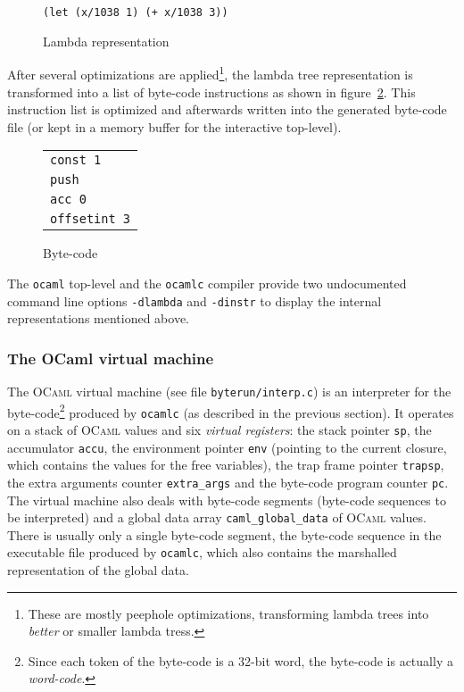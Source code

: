 \documentclass[a4paper]{acm_proc_article-sp}
\begin{document}
\begin{figure}[ht]
  \centering
  \texttt{(let (x/1038 1) (+ x/1038 3))}
  \caption{Lambda representation}
  \label{figure:Lambda_representation}
\end{figure}

After several optimizations are applied\footnote{These are mostly peephole optimizations, transforming
  lambda trees into {\em better} or smaller lambda tress.}, the lambda tree representation is
transformed into a list of byte-code instructions as shown in figure~\ref{figure:Byte_code}.
This instruction list is optimized and afterwards written into the generated byte-code file
(or kept in a memory buffer for the interactive top-level).

\begin{figure}[ht]
  \centering
  \begin{tabular}{l}
    \texttt{const 1} \\
    \texttt{push} \\
    \texttt{acc 0} \\
    \texttt{offsetint 3}
  \end{tabular}
  \caption{Byte-code}
  \label{figure:Byte_code}
\end{figure}

The \texttt{ocaml} top-level and the \texttt{ocamlc} compiler provide two undocumented command
line options \texttt{-dlambda} and \texttt{-dinstr} to display the internal representations
mentioned above.

\subsubsection{The OCaml virtual machine}

The \textsc{OCaml} virtual machine (see file \texttt{byterun/interp.c}) is an interpreter for the
byte-code\footnote{Since each token of the byte-code is a 32-bit word, the byte-code is actually
  a \emph{word-code}.} produced by \texttt{ocamlc} (as described in the previous section). It operates on a 
stack of \textsc{OCaml} values and six \emph{virtual registers}: the stack pointer \texttt{sp},
the accumulator \texttt{accu}, the environment pointer \texttt{env} (pointing to the current
closure, which contains the values for the free variables), the trap frame pointer \texttt{trapsp},
the extra arguments counter \texttt{extra\_args} and the byte-code program counter \texttt{pc}.
The virtual machine also deals with byte-code segments (byte-code sequences to be interpreted)
and a global data array \texttt{caml\_global\_data} of \textsc{OCaml} values. There is usually
only a single byte-code segment, the byte-code sequence in the executable file produced by
\texttt{ocamlc}, which also contains the marshalled representation of the global data.
\end{document}
